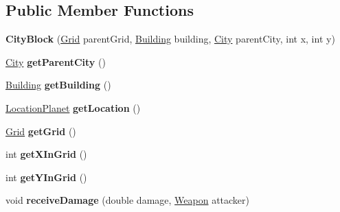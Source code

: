 \subsection*{Public Member Functions}
\begin{DoxyCompactItemize}
\item 
{\bfseries City\+Block} (\hyperlink{classplanets_1_1_grid}{Grid} parent\+Grid, \hyperlink{classbuildings_1_1_building}{Building} building, \hyperlink{classcities_1_1_city}{City} parent\+City, int x, int y)\hypertarget{classcities_1_1_city_block_a4a37ec02b8741edb9f19310a0e454819}{}\label{classcities_1_1_city_block_a4a37ec02b8741edb9f19310a0e454819}

\item 
\hyperlink{classcities_1_1_city}{City} {\bfseries get\+Parent\+City} ()\hypertarget{classcities_1_1_city_block_a2fc4ffcb0206f8f928d2470303f042eb}{}\label{classcities_1_1_city_block_a2fc4ffcb0206f8f928d2470303f042eb}

\item 
\hyperlink{classbuildings_1_1_building}{Building} {\bfseries get\+Building} ()\hypertarget{classcities_1_1_city_block_a98d96f62b4dce3a8740254f7afdec9d3}{}\label{classcities_1_1_city_block_a98d96f62b4dce3a8740254f7afdec9d3}

\item 
\hyperlink{classplanets_1_1_location_planet}{Location\+Planet} {\bfseries get\+Location} ()\hypertarget{classcities_1_1_city_block_a61a3f2cc6eb16526c9b25a7f8d3c4448}{}\label{classcities_1_1_city_block_a61a3f2cc6eb16526c9b25a7f8d3c4448}

\item 
\hyperlink{classplanets_1_1_grid}{Grid} {\bfseries get\+Grid} ()\hypertarget{classcities_1_1_city_block_acd535c3e2a10b8ad2d70cddf3486249c}{}\label{classcities_1_1_city_block_acd535c3e2a10b8ad2d70cddf3486249c}

\item 
int {\bfseries get\+X\+In\+Grid} ()\hypertarget{classcities_1_1_city_block_a538a9efc4ceadefe03c9021accfe18a8}{}\label{classcities_1_1_city_block_a538a9efc4ceadefe03c9021accfe18a8}

\item 
int {\bfseries get\+Y\+In\+Grid} ()\hypertarget{classcities_1_1_city_block_a21493660b51709c375d1e6605f1113ca}{}\label{classcities_1_1_city_block_a21493660b51709c375d1e6605f1113ca}

\item 
void {\bfseries receive\+Damage} (double damage, \hyperlink{classtools_1_1weapons_1_1_weapon}{Weapon} attacker)\hypertarget{classcities_1_1_city_block_a25446af6a903c2ad5f0eddd81c25df8e}{}\label{classcities_1_1_city_block_a25446af6a903c2ad5f0eddd81c25df8e}


\end{DoxyCompactItemize}
